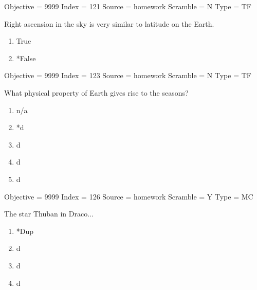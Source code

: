\documentclass[11pt]{article}
\begin{document}
\begin{enumerate}
\begin{minipage}{\textwidth}
\begin{minipage}{\textwidth}
Objective = 9999
Index = 121
Source = homework
Scramble = N
Type = TF
\end{minipage}
\end{minipage}
\vskip 0.20in

\begin{minipage}{\textwidth}
\begin{minipage}{\textwidth}
\item Right ascension in the sky is very similar to latitude on the Earth.
\begin{multicols}{3}
\begin{enumerate} 
\setlength{\itemsep}{1pt} 
\setlength{\parskip}{0pt} 
\setlength{\parsep}{0pt}
\setlength{\multicolsep}{1pt} 
\item True
\item *False
\end{enumerate} 
\vfill 
\end{multicols}

Objective = 9999
Index = 123
Source = homework
Scramble = N
Type = TF
\end{minipage}
\end{minipage}
\vskip 0.20in

\begin{minipage}{\textwidth}
\begin{minipage}{\textwidth}
\item What physical property of Earth gives rise to the seasons?
\begin{multicols}{3}
\begin{enumerate} 
\setlength{\itemsep}{1pt} 
\setlength{\parskip}{0pt} 
\setlength{\parsep}{0pt}
\setlength{\multicolsep}{1pt} 
\item n/a
\item *d
\item d
\item d
\item d
\end{enumerate} 
\vfill 
\end{multicols}

Objective = 9999
Index = 126
Source = homework
Scramble = Y
Type = MC
\end{minipage}
\end{minipage}
\vskip 0.20in

\begin{minipage}{\textwidth}
\begin{minipage}{\textwidth}
\item The star Thuban in Draco...
\begin{multicols}{3}
\begin{enumerate} 
\setlength{\itemsep}{1pt} 
\setlength{\parskip}{0pt} 
\setlength{\parsep}{0pt}
\setlength{\multicolsep}{1pt} 
\item *Dup
\item d
\item d
\item d
\end{enumerate} 
\vfill 
\end{multicols}


\end{minipage}
\end{minipage}
\end{enumerate}
\end{document}
